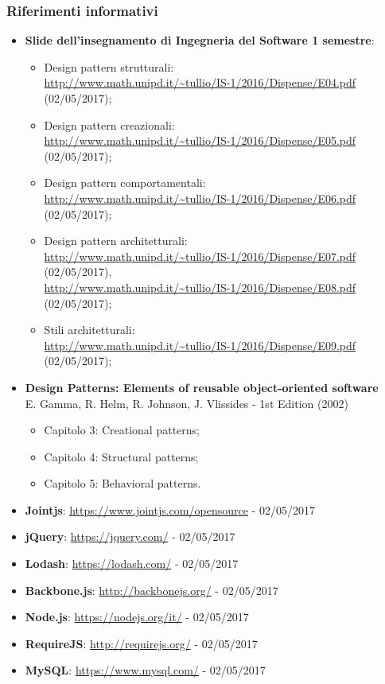 \documentclass[../DefinizioneDiProdotto.tex]{subfiles}
\begin{document}
			\subsubsection{Riferimenti informativi}	
				\begin{itemize}
					\item \textbf{Slide dell'insegnamento di Ingegneria del Software
					1 semestre}:
					\begin{itemize}
						\item Design pattern strutturali:\\
						\url{http://www.math.unipd.it/~tullio/IS-1/2016/Dispense/E04.pdf} (02/05/2017);
						\item Design pattern creazionali:\\
						\url{http://www.math.unipd.it/~tullio/IS-1/2016/Dispense/E05.pdf} (02/05/2017);
						\item Design pattern comportamentali:\\
						\url{http://www.math.unipd.it/~tullio/IS-1/2016/Dispense/E06.pdf} (02/05/2017);
						\item Design pattern architetturali:\\
						\url{http://www.math.unipd.it/~tullio/IS-1/2016/Dispense/E07.pdf} (02/05/2017),\\
						\url{http://www.math.unipd.it/~tullio/IS-1/2016/Dispense/E08.pdf} (02/05/2017);
						\item Stili architetturali:\\
						\url{http://www.math.unipd.it/~tullio/IS-1/2016/Dispense/E09.pdf} (02/05/2017);
					\end{itemize}
					\item \textbf{Design Patterns: Elements of reusable object-oriented software}\\
					E. Gamma, R. Helm, R. Johnson, J. Vlissides - 1st Edition (2002)
					\begin{itemize}
						\item Capitolo 3: Creational patterns;
						\item Capitolo 4: Structural patterns;
						\item Capitolo 5: Behavioral patterns.
					\end{itemize}
					\item \textbf{Jointjs}: \url{https://www.jointjs.com/opensource} - 02/05/2017
					\item \textbf{jQuery}: \url{https://jquery.com/} - 02/05/2017
					\item \textbf{Lodash}: \url{https://lodash.com/} - 02/05/2017
					\item \textbf{Backbone.js}: \url{http://backbonejs.org/} - 02/05/2017
					\item \textbf{Node.js}: \url{https://nodejs.org/it/} - 02/05/2017
					\item \textbf{RequireJS}: \url{http://requirejs.org/} - 02/05/2017
					\item \textbf{MySQL}: \url{https://www.mysql.com/} - 02/05/2017
				\end{itemize}
\end{document}
